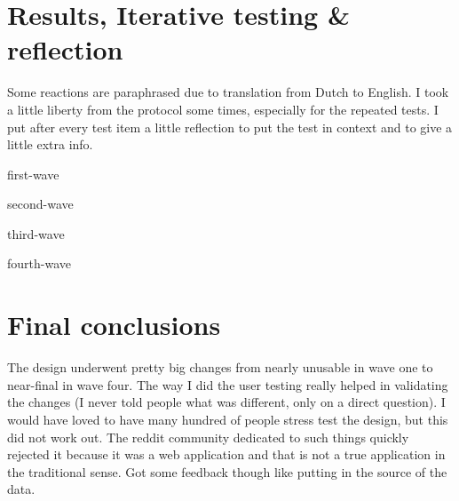 \documentclass[final,a4paper,11pt]{article}
\begin{document}
\section*{Results, Iterative testing \& reflection}
Some reactions are paraphrased due to translation from Dutch to English. I took a little liberty from the protocol some times, especially for the repeated tests. I put after every test item a little reflection to put the test in context and to give a little extra info.

{first-wave}

{second-wave}

{third-wave}

{fourth-wave}

\section*{Final conclusions}
The design underwent pretty big changes from nearly unusable in wave one to near-final in wave four. The way I did the user testing really helped in validating the changes (I never told people what was different, only on a direct question). I would have loved to have many hundred of people stress test the design, but this did not work out. The reddit community dedicated to such things quickly rejected it because it was a web application and that is not a true application in the traditional sense. Got some feedback though like putting in the source of the data.
\end{document}

